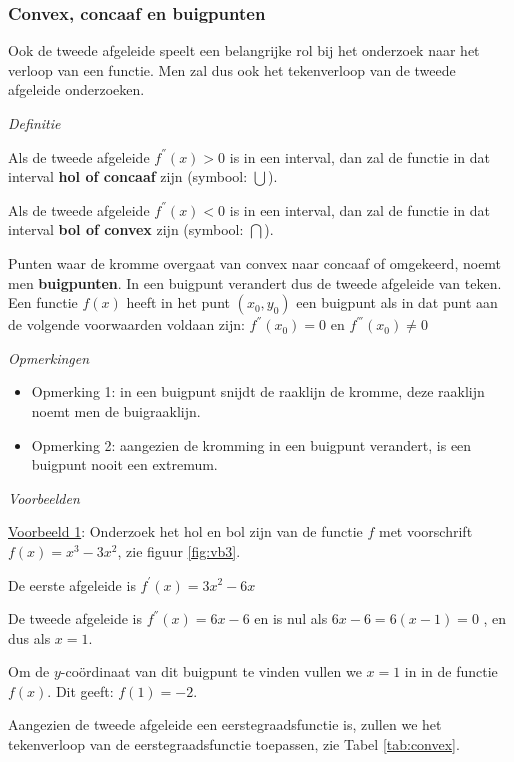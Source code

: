 \subsubsection{Convex, concaaf en buigpunten}

\noindent Ook de tweede afgeleide speelt een belangrijke rol bij het
onderzoek naar het verloop van een functie. Men zal dus ook het tekenverloop
van de tweede afgeleide onderzoeken.\medskip{}

\emph{Definitie}

\noindent Als de tweede afgeleide $f^{''}(x)>0$ is in een interval,
dan zal de functie in dat interval \textbf{hol of concaaf} zijn (symbool:
$\bigcup$).

\noindent Als de tweede afgeleide $f^{''}(x)<0$ is in een interval,
dan zal de functie in dat interval \textbf{bol of convex} zijn (symbool:
$\bigcap$).

\noindent Punten waar de kromme overgaat van convex naar concaaf of
omgekeerd, noemt men \textbf{buigpunten}. In een buigpunt verandert
dus de tweede afgeleide van teken. Een functie $f(x)$ heeft in het
punt $(x_{0},y_{0})$ een buigpunt als in dat punt aan de volgende
voorwaarden voldaan zijn: $f^{''}(x_{0})=0$ en $f^{'''}(x_{0})\neq0$

\emph{Opmerkingen}
\begin{itemize}
	\item Opmerking 1: in een buigpunt snijdt de raaklijn de kromme,
	deze raaklijn noemt men de buigraaklijn.
	
	\item Opmerking 2: aangezien de kromming in een buigpunt verandert,
	is een buigpunt nooit een extremum.
\end{itemize}

\emph{Voorbeelden}

\noindent \uline{Voorbeeld 1}: Onderzoek het hol en bol zijn van
de functie $f$ met voorschrift $f(x)=x^{3}-3x^{2}$, zie figuur \ref{fig:vb3}.

\noindent De eerste afgeleide is $f^{'}(x)=3x^{2}-6x$ 

\noindent De tweede afgeleide is $f^{''}(x)=6x-6$ en is nul als $6x-6=6(x-1)=0$
, en dus als $x=1$.

\noindent Om de $y$-co\"ordinaat van dit buigpunt te vinden vullen
we $x=1$ in in de functie $f(x)$. Dit geeft: $f(1)=-2$.

\noindent Aangezien de tweede afgeleide een eerstegraadsfunctie is,
zullen we het tekenverloop van de eerstegraadsfunctie toepassen, zie Tabel \ref{tab:convex}.

